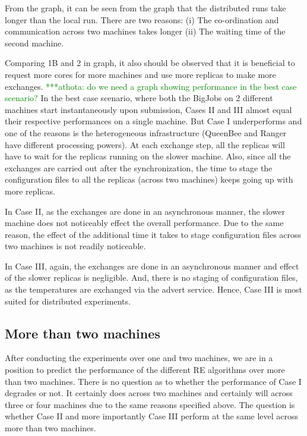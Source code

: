 \documentclass[a4paper,10pt]{article}
\newcommand{\athotanote}[1]{ {\textcolor{green} { ***athota: #1 }}}
\newcommand{\athotanote}[1]{}
\begin{document}
From the graph, it can be seen from the graph that the distributed runs take longer than the local run. There are two reasons:
(i) The co-ordination and communication across two machines takes longer
(ii) The waiting time of the second machine.

Comparing 1B and 2 in graph, it also should be observed that it is beneficial to request more cores for more machines and use more replicas to make more exchanges.
\athotanote{do we need a graph showing performance in the best case scenario?}In the best case scenario, where both the BigJobs on 2 different machines start instantaneously upon submission, Cases II and III almost equal their respective performances on a single machine. But Case I underperforms and one of the reasons is the heterogeneous infrastructure (QueenBee and Ranger have different processing powers). At each exchange step, all the replicas will have to wait for the replicas running on the slower machine. Also, since all the exchanges are carried out after the synchronization, the time to stage the configuration files to all the replicas (across two machines) keeps going up with more replicas.

In Case II, as the exchanges are done in an asynchronous manner, the slower machine does not noticeably effect the overall performance. Due to the same reason, the effect of  the additional time it takes to stage configuration files across two machines is not readily noticeable. 

In Case III, again, the exchanges are done in an asynchronous manner and effect of the slower replicas is negligible. And, there is no staging of configuration files, as the temperatures are exchanged via the advert service. Hence, Case III is most suited for distributed experiments. 

\subsection{More than two machines}

After conducting the experiments over one and two machines, we are in a position to predict the performance of the different RE algorithms over more than two machines. 
There is no question as to whether the performance of Case I degrades or not. It certainly does across two machines and certainly will across three or four machines due to the same reasons specified above. The question is whether Case II and more importantly Case III perform at the same level across more than two machines. 
\end{document}
